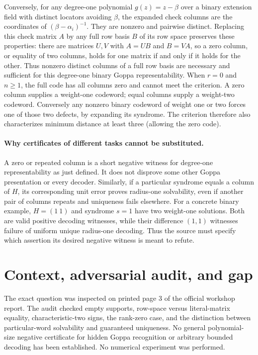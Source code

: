 \documentclass[11pt]{article}
\begin{document}
Conversely, for any degree-one polynomial $g(z)=z-\beta$ over a binary
extension field with distinct locators avoiding $\beta$, the expanded check
columns are the coordinates of $(\beta-\alpha_i)^{-1}$.
They are nonzero and pairwise distinct. Replacing this check matrix $A$ by
any full row basis $B$ of its row space preserves these properties: there
are matrices $U,V$ with $A=UB$ and $B=VA$, so a zero column, or equality of
two columns, holds for one matrix if and only if it holds for the other.
Thus nonzero distinct columns of a full row basis are necessary and sufficient
for this degree-one binary Goppa representability. When $r=0$ and $n\ge1$,
the full code has all columns zero and cannot meet the criterion.
A zero column supplies a weight-one codeword; equal columns supply a weight-two
codeword. Conversely any nonzero binary codeword of weight one or two forces
one of those two defects, by expanding its syndrome. The criterion therefore
also characterizes minimum distance at least three (allowing the zero code).

\paragraph{Why certificates of different tasks cannot be substituted.}
A zero or repeated column is a short negative witness for degree-one
representability as just defined. It does not disprove some other Goppa
presentation or every decoder. Similarly, if a particular syndrome equals a
column of $H$, its corresponding unit error proves radius-one solvability,
even if another pair of columns repeats and uniqueness fails elsewhere.
For a concrete binary example, $H=(1\ 1)$ and syndrome $s=1$ have two
weight-one solutions. Both are valid positive decoding witnesses, while their
difference $(1,1)$ witnesses failure of uniform unique radius-one decoding.
Thus the source must specify which assertion its desired negative witness
is meant to refute.

\section{Context, adversarial audit, and gap}
The exact question was inspected on printed page 3 of the official workshop
report. The audit checked empty supports, row-space versus literal-matrix
equality, characteristic-two signs, the rank-zero case, and the distinction
between particular-word solvability and guaranteed uniqueness. No general
polynomial-size negative certificate for hidden Goppa recognition or arbitrary
bounded decoding has been established. No numerical experiment was performed.
\end{document}
